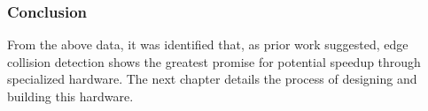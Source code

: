     \subsubsection*{Conclusion}
        From the above data, it was identified that, as prior work suggested, edge collision detection shows the greatest promise for potential speedup through specialized hardware. The next chapter details the process of designing and building this hardware.

    
